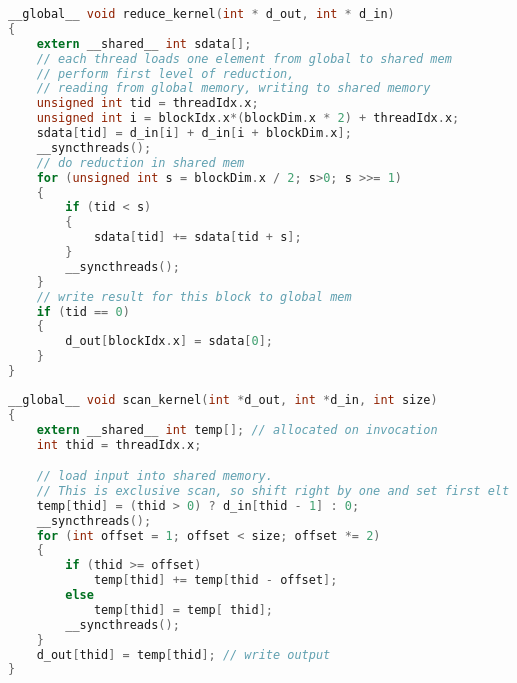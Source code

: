 \begin{lstlisting}[language=C,caption={Reduction kernel},label=lst:reduce_kernel]
__global__ void reduce_kernel(int * d_out, int * d_in)
{
    extern __shared__ int sdata[];
    // each thread loads one element from global to shared mem
    // perform first level of reduction,
    // reading from global memory, writing to shared memory
    unsigned int tid = threadIdx.x;
    unsigned int i = blockIdx.x*(blockDim.x * 2) + threadIdx.x;
    sdata[tid] = d_in[i] + d_in[i + blockDim.x];
    __syncthreads();
    // do reduction in shared mem
    for (unsigned int s = blockDim.x / 2; s>0; s >>= 1)
    {
        if (tid < s)
        {
		    sdata[tid] += sdata[tid + s];
        }
        __syncthreads();
    }
    // write result for this block to global mem
    if (tid == 0)
    {
	    d_out[blockIdx.x] = sdata[0];
    }
}
\end{lstlisting}

\begin{lstlisting}[language=C,caption={Hillis Steele scan kernel},label=lst:hillis_steele_scan_kernel]
__global__ void scan_kernel(int *d_out, int *d_in, int size)
{
    extern __shared__ int temp[]; // allocated on invocation
    int thid = threadIdx.x;

    // load input into shared memory.
    // This is exclusive scan, so shift right by one and set first elt to 0
    temp[thid] = (thid > 0) ? d_in[thid - 1] : 0;
    __syncthreads();
    for (int offset = 1; offset < size; offset *= 2)
    {
        if (thid >= offset)
            temp[thid] += temp[thid - offset];
        else
            temp[thid] = temp[ thid];
        __syncthreads();
    }
    d_out[thid] = temp[thid]; // write output
}
\end{lstlisting}


